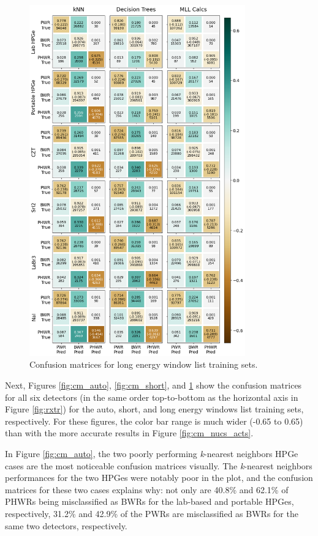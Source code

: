 \begin{figure}[!htbp]
  \centering
  \includegraphics[width=0.83\textwidth]{./chapters/exp2/confusion_matrix_6dets_long.png}
  \caption[Confusion matrices for long energy window list training sets.]
          {Confusion matrices for long energy window list training sets.}
  \label{fig:cm_long}
\end{figure}

Next, Figures \ref{fig:cm_auto}, \ref{fig:cm_short}, and \ref{fig:cm_long} show
the confusion matrices for all six detectors (in the same order top-to-bottom
as the horizontal axis in Figure \ref{fig:rxtr}) for the auto, short, and long
energy windows list training sets, respectively. For these figures, the color
bar range is much wider (-0.65 to 0.65) than with the more accurate results in
Figure \ref{fig:cm_nucs_acts}. 

In Figure \ref{fig:cm_auto}, the two poorly performing \textit{k}-nearest
neighbors \gls{HPGe} cases are the most noticeable confusion matrices visually.
The \textit{k}-nearest neighbors performances for the two \gls{HPGe}s were
notably poor in the plot, and the confusion matrices for these two cases
explains why: not only are 40.8\% and 62.1\% of \gls{PHWR}s being misclassified
as \gls{BWR}s for the lab-based and portable \gls{HPGe}s, respectively, 31.2\%
and 42.9\% of the \gls{PWR}s are misclassified as \gls{BWR}s for the same two
detectors, respectively.

